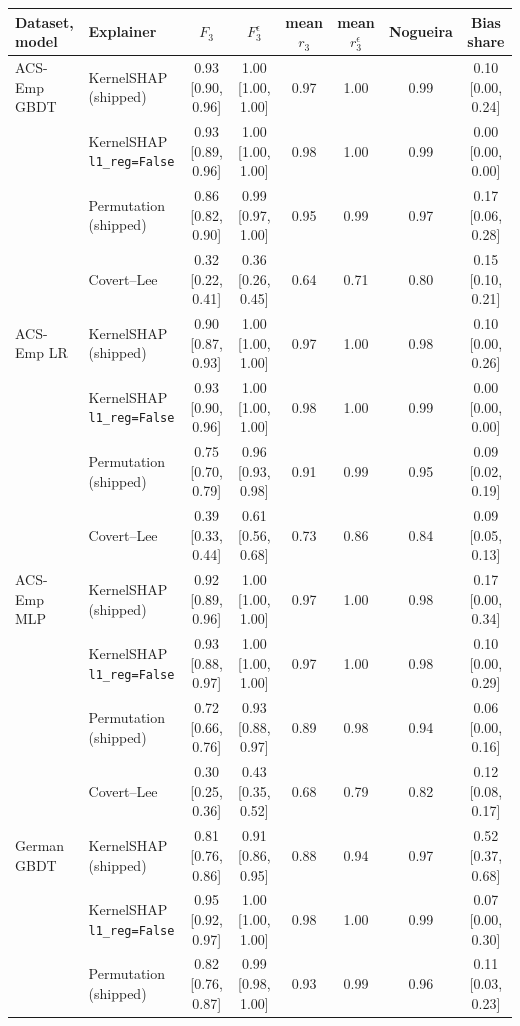 \begingroup\setlength{\tabcolsep}{2.5pt}
\begin{tabular}{@{}llcccccc@{}}
\toprule
Dataset, model & Explainer & $F_3$ & $F_3^{\epsilon}$ & mean $r_3$ & mean $r_3^{\epsilon}$ & Nogueira & Bias share \\
\midrule
ACS-Emp GBDT & KernelSHAP (shipped) & 0.93 [0.90, 0.96] & 1.00 [1.00, 1.00] & 0.97 & 1.00 & 0.99 & 0.10 [0.00, 0.24] \\
 & KernelSHAP \texttt{l1\_reg=False} & 0.93 [0.89, 0.96] & 1.00 [1.00, 1.00] & 0.98 & 1.00 & 0.99 & 0.00 [0.00, 0.00] \\
 & Permutation (shipped) & 0.86 [0.82, 0.90] & 0.99 [0.97, 1.00] & 0.95 & 0.99 & 0.97 & 0.17 [0.06, 0.28] \\
 & Covert--Lee & 0.32 [0.22, 0.41] & 0.36 [0.26, 0.45] & 0.64 & 0.71 & 0.80 & 0.15 [0.10, 0.21] \\
\addlinespace[2pt]
ACS-Emp LR & KernelSHAP (shipped) & 0.90 [0.87, 0.93] & 1.00 [1.00, 1.00] & 0.97 & 1.00 & 0.98 & 0.10 [0.00, 0.26] \\
 & KernelSHAP \texttt{l1\_reg=False} & 0.93 [0.90, 0.96] & 1.00 [1.00, 1.00] & 0.98 & 1.00 & 0.99 & 0.00 [0.00, 0.00] \\
 & Permutation (shipped) & 0.75 [0.70, 0.79] & 0.96 [0.93, 0.98] & 0.91 & 0.99 & 0.95 & 0.09 [0.02, 0.19] \\
 & Covert--Lee & 0.39 [0.33, 0.44] & 0.61 [0.56, 0.68] & 0.73 & 0.86 & 0.84 & 0.09 [0.05, 0.13] \\
\addlinespace[2pt]
ACS-Emp MLP & KernelSHAP (shipped) & 0.92 [0.89, 0.96] & 1.00 [1.00, 1.00] & 0.97 & 1.00 & 0.98 & 0.17 [0.00, 0.34] \\
 & KernelSHAP \texttt{l1\_reg=False} & 0.93 [0.88, 0.97] & 1.00 [1.00, 1.00] & 0.97 & 1.00 & 0.98 & 0.10 [0.00, 0.29] \\
 & Permutation (shipped) & 0.72 [0.66, 0.76] & 0.93 [0.88, 0.97] & 0.89 & 0.98 & 0.94 & 0.06 [0.00, 0.16] \\
 & Covert--Lee & 0.30 [0.25, 0.36] & 0.43 [0.35, 0.52] & 0.68 & 0.79 & 0.82 & 0.12 [0.08, 0.17] \\
\addlinespace[2pt]
German GBDT & KernelSHAP (shipped) & 0.81 [0.76, 0.86] & 0.91 [0.86, 0.95] & 0.88 & 0.94 & 0.97 & 0.52 [0.37, 0.68] \\
 & KernelSHAP \texttt{l1\_reg=False} & 0.95 [0.92, 0.97] & 1.00 [1.00, 1.00] & 0.98 & 1.00 & 0.99 & 0.07 [0.00, 0.30] \\
 & Permutation (shipped) & 0.82 [0.76, 0.87] & 0.99 [0.98, 1.00] & 0.93 & 0.99 & 0.96 & 0.11 [0.03, 0.23] \\

\end{tabular}
